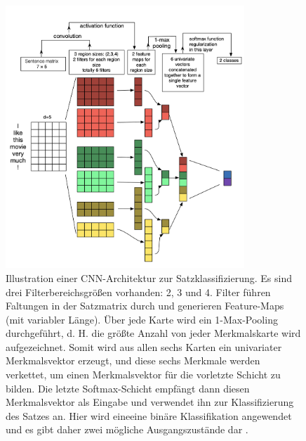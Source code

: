 \begin{figure}[H]
    \centering
    \includegraphics[width=9cm]{kapitel2/cnnnlp.png}
    \caption[CNN in der Textverarbeitung]{Illustration einer CNN-Architektur zur Satzklassifizierung. Es sind drei Filterbereichsgrößen vorhanden: 2, 3 und 4. Filter führen Faltungen in der Satzmatrix durch und generieren Feature-Maps (mit variabler Länge). Über jede Karte wird ein 1-Max-Pooling durchgeführt, d. H. die größte Anzahl von jeder Merkmalskarte wird aufgezeichnet. Somit wird aus allen sechs Karten ein univariater Merkmalsvektor erzeugt, und diese sechs Merkmale werden verkettet, um einen Merkmalsvektor für die vorletzte Schicht zu bilden. Die letzte Softmax-Schicht empfängt dann diesen Merkmalsvektor als Eingabe und verwendet ihn zur Klassifizierung des Satzes an. Hier wird eineeine binäre Klassifikation angewendet und es gibt daher zwei mögliche Ausgangszustände dar \cite*{Zhang}.}
    \label{Kap2:Pooling}
\end{figure}